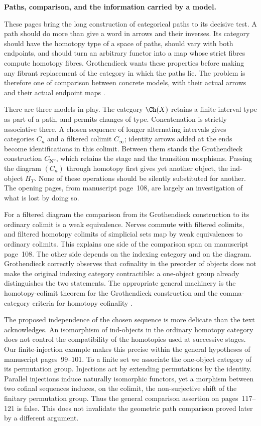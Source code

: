 \begingroup
{}
\noindent\textbf{Paths, comparison, and the information carried by a model.}

These pages bring the long construction of categorical paths to its decisive
test.  A path should do more than give a word in arrows and their inverses.  Its
category should have the homotopy type of a space of paths, should vary with
both endpoints, and should turn an arbitrary functor into a map whose strict
fibres compute homotopy fibres.  Grothendieck wants these properties before
making any fibrant replacement of the category in which the paths lie.  The
problem is therefore one of comparison between concrete models, with their
actual arrows and their actual endpoint maps
\citep[ms.~108--171]{GrothendieckDerivateursVII}.

There are three models in play.  The category $\Ch(X)$ retains a finite interval
type as part of a path, and permits changes of type.  Concatenation is strictly
associative there.  A chosen sequence of longer alternating intervals gives
categories $C_n$ and a filtered colimit $C_\infty$; identity arrows added at the
ends become identifications in this colimit.  Between them stands the
Grothendieck construction $C_{\mathbf N^o}$, which retains the stage and the
transition morphisms.  Passing the diagram $(C_n)$ through homotopy first gives
yet another object, the ind-object $H_T$.  None of these operations should be
silently substituted for another.  The opening pages, from manuscript page~108, are largely
an investigation of what is lost by doing so.

For a filtered diagram the comparison from its Grothendieck construction to
its ordinary colimit is a weak equivalence.  Nerves commute with filtered
colimits, and filtered homotopy colimits of simplicial sets map by weak
equivalences to ordinary colimits.  This explains one side of the comparison
span on manuscript page~108.  The other side depends on the indexing category
and on the diagram.  Grothendieck correctly observes that cofinality in the
preorder of objects does not make the original indexing category contractible:
a one-object group already distinguishes the two statements.  The appropriate
general machinery is the homotopy-colimit theorem for the Grothendieck
construction and the comma-category criteria for homotopy cofinality
\citep{Thomason1979,Quillen1973}.

The proposed independence of the chosen sequence is more delicate than the
text acknowledges.  An isomorphism of ind-objects in the ordinary homotopy
category does not control the compatibility of the homotopies used at
successive stages.  Our finite-injection example makes this precise within the
general hypotheses of manuscript pages~99--101.  To a finite set we associate
the one-object category of its permutation group.  Injections act by extending
permutations by the identity.  Parallel injections induce naturally isomorphic
functors, yet a morphism between two cofinal sequences induces, on the colimit,
the non-surjective shift of the finitary permutation group.  Thus the general
comparison assertion on pages~117--121 is false.  This does not invalidate the
geometric path comparison proved later by a different argument.

